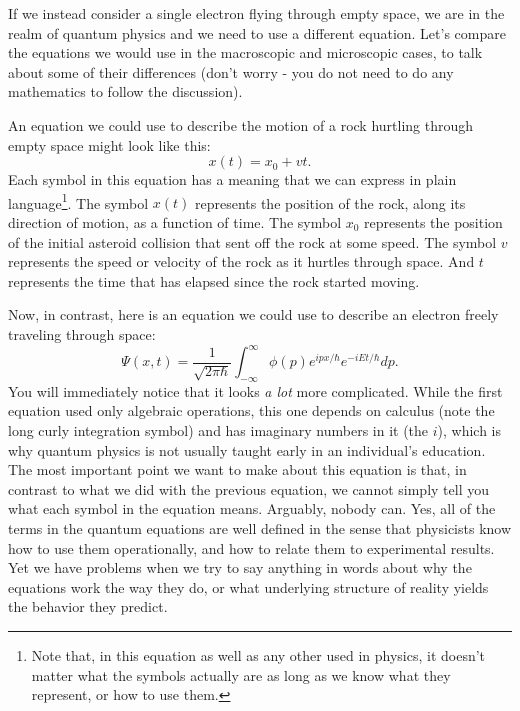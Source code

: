 \documentclass[12pt,onecolumn,preprintnumbers,amsmath,amssymbn,reprint,nofootinbib,superscriptaddress]{revtex4}    %
\begin{document}
If we instead consider a single electron flying through empty space, we are in the realm of quantum physics and we need to use a different equation.  Let's compare the equations we would use in the macroscopic and microscopic cases, to talk about some of their differences (don't worry - you do not need to do any mathematics to follow the discussion).  

An equation we could use to describe the motion of a rock hurtling through empty space might look like this:
\begin{equation}
x(t)=x_0+vt.
\end{equation}
Each symbol in this equation has a meaning that we can express in plain language\footnote{Note that, in this equation as well as any other used in physics, it doesn't matter what the symbols actually are as long as we know what they represent, or how to use them.}. The symbol $x(t)$ represents the position of the rock, along its direction of motion, as a function of time.  The symbol $x_0$ represents the position of the initial asteroid collision that sent off the rock at some speed.  The symbol $v$ represents the speed or velocity of the rock as it hurtles through space.  And $t$ represents the time that has elapsed since the rock started moving.  

Now, in contrast, here is an equation we could use to describe an electron freely traveling through space:
\begin{equation}
\Psi(x,t)=\frac{1}{\sqrt{2\pi\hbar}}\int^\infty_{-\infty}\phi(p)e^{ipx/\hbar}e^{-iEt/\hbar}dp.
\end{equation}
You will immediately notice that it looks {\em a lot} more complicated.  While the first equation used only algebraic operations, this one depends on calculus (note the long curly integration symbol) and has imaginary numbers in it (the $i$), which is why quantum physics is not usually taught early in an individual's education.  The most important point we want to make about this equation is that, in contrast to what we did with the previous equation, we cannot simply tell you what each symbol in the equation means.  Arguably, nobody can.  Yes, all of the terms in the quantum equations are well defined in the sense that physicists know how to use them operationally, and how to relate them to experimental results.  Yet we have problems when we try to say anything in words about why the equations work the way they do, or what underlying structure of reality yields the behavior they predict.
\end{document}
